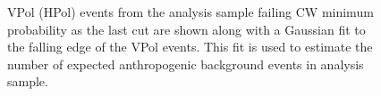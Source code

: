 \begin{figure}[htpb]
\hfill
{}
\caption{VPol (HPol) events from the analysis sample failing CW minimum probability as the last cut are shown along with a Gaussian fit to the falling edge of the VPol events. This fit is used to estimate the number of expected anthropogenic background events in analysis sample.}
\label{fig:Analysis:Background-Estimation:CW-Background}
\end{figure}
